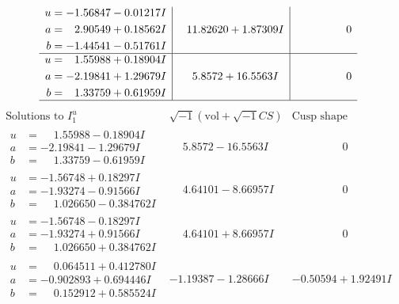 \documentclass[1p]{elsarticle_modified}
\theoremstyle{definition}
\newcommand{\I}{\sqrt{-1}}
\begin{document}
$$\begin{array}{c|c|c}
\begin{aligned}
u &= -1.56847 - 0.01217 I \\
a &= \phantom{-}2.90549 + 0.18562 I \\
b &= -1.44541 - 0.51761 I\end{aligned}
 & \phantom{-}11.82620 + 1.87309 I & \phantom{-0.000000 } 0 \\ \hline\begin{aligned}
u &= \phantom{-}1.55988 + 0.18904 I \\
a &= -2.19841 + 1.29679 I \\
b &= \phantom{-}1.33759 + 0.61959 I\end{aligned}
 & \phantom{-}5.8572 + 16.5563 I & \phantom{-0.000000 } 0\\
 \hline 
 \end{array}$$\newpage$$\begin{array}{c|c|c}  
\text{Solutions to }I^u_{1}& \I (\text{vol} + \sqrt{-1}CS) & \text{Cusp shape}\\
 \hline 
\begin{aligned}
u &= \phantom{-}1.55988 - 0.18904 I \\
a &= -2.19841 - 1.29679 I \\
b &= \phantom{-}1.33759 - 0.61959 I\end{aligned}
 & \phantom{-}5.8572 - 16.5563 I & \phantom{-0.000000 } 0 \\ \hline\begin{aligned}
u &= -1.56748 + 0.18297 I \\
a &= -1.93274 - 0.91566 I \\
b &= \phantom{-}1.026650 - 0.384762 I\end{aligned}
 & \phantom{-}4.64101 - 8.66957 I & \phantom{-0.000000 } 0 \\ \hline\begin{aligned}
u &= -1.56748 - 0.18297 I \\
a &= -1.93274 + 0.91566 I \\
b &= \phantom{-}1.026650 + 0.384762 I\end{aligned}
 & \phantom{-}4.64101 + 8.66957 I & \phantom{-0.000000 } 0 \\ \hline\begin{aligned}
u &= \phantom{-}0.064511 + 0.412780 I \\
a &= -0.902893 + 0.694446 I \\
b &= \phantom{-}0.152912 + 0.585524 I\end{aligned}
 & -1.19387 - 1.28666 I & -0.50594 + 1.92491 I \\ \hline\begin{aligned}

\end{aligned}
\end{array}$$
\end{document}
